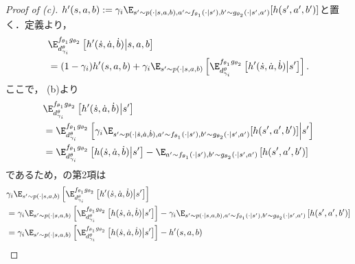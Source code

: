 \documentclass[a4paper,10pt,dvipdfmx]{jsarticle}
\begin{document}
\begin{proof}[Proof of (c)]
    $h'(s,a,b):=\gamma_i\E_{s'\sim p(\cdot|s,a,b),a'\sim f_{\theta_1}(\cdot|s'),b'\sim g_{\theta_2}(\cdot|s',a')}[h(s',a',b')]$と置く．定義より，
    \begin{subequations}
    \begin{align}
        &\E_{d_{\gamma_i}^{\theta}}^{f_{\theta_1}g_{\theta_2}}\left[h'(\dot{s},\dot{a},\dot{b})\middle|s,a,b\right]\\
        &=(1-\gamma_i)h'(s,a,b) + \gamma_i\E_{s'\sim p(\cdot|s,a,b)}\left[\E_{d_{\gamma_i}^{\theta}}^{f_{\theta_1}g_{\theta_2}}\left[h'(\dot{s},\dot{a},\dot{b})\middle|s'\right]\right].\label{eq:proof_lemma_exp_ocup_c_1}
    \end{align}
    \end{subequations}
    ここで， (b)より
    \begin{subequations}
    \begin{align}
        &\E_{d_{\gamma_i}^{\theta}}^{f_{\theta_1}g_{\theta_2}}\left[h'(\dot{s},\dot{a},\dot{b})\middle|s'\right]\\
        &=\E_{d_{\gamma_i}^{\theta}}^{f_{\theta_1}g_{\theta_2}}\left[\gamma_i\E_{s'\sim p(\cdot|\dot{s},\dot{a},\dot{b}),a'\sim f_{\theta_1}(\cdot|s'),b'\sim g_{\theta_2}(\cdot|s',a')}[h(s',a',b')]\middle|s'\right]\\
        &=\E_{d_{\gamma_i}^{\theta}}^{f_{\theta_1}g_{\theta_2}}\left[h(\dot{s},\dot{a},\dot{b})\middle|s'\right]-\E_{a'\sim f_{\theta_1}(\cdot|s'),b'\sim g_{\theta_2}(\cdot|s',a')}\left[h(s',a',b')\right]
    \end{align}
    \end{subequations}
    であるため，の第2項は
    \begin{subequations}
    \begin{align}
        &\gamma_i\E_{s'\sim p(\cdot|s,a,b)}\left[\E_{d_{\gamma_i}^{\theta}}^{f_{\theta_1}g_{\theta_2}}\left[h'(\dot{s},\dot{a},\dot{b})\middle|s'\right]\right]\\
        &=\gamma_i\E_{s'\sim p(\cdot|s,a,b)}\left[\E_{d_{\gamma_i}^{\theta}}^{f_{\theta_1}g_{\theta_2}}\left[h(\dot{s},\dot{a},\dot{b})\middle|s'\right]\right] - \gamma_i\E_{s'\sim p(\cdot|s,a,b),a'\sim f_{\theta_1}(\cdot|s'),b'\sim g_{\theta_2}(\cdot|s',a')}\left[h(s',a',b')\right]\\
        &=\gamma_i\E_{s'\sim p(\cdot|s,a,b)}\left[\E_{d_{\gamma_i}^{\theta}}^{f_{\theta_1}g_{\theta_2}}\left[h(\dot{s},\dot{a},\dot{b})\middle|s'\right]\right] - h'(s,a,b)

\end{align}
\end{subequations}
\end{proof}
\end{document}
